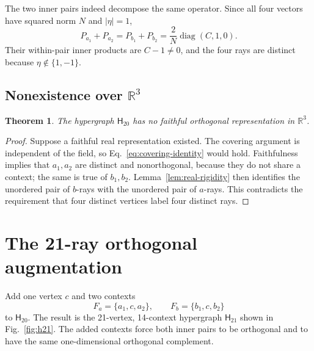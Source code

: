 \documentclass[twocolumn,aps,pra,floatfix,amsmath,amssymb,longbibliography]{revtex4-2}
\newtheorem{theorem}{Theorem}
\theoremstyle{definition}
\theoremstyle{remark}
\newcommand{\R}{\mathbb R}
\newcommand{\Htwenty}{\mathsf H_{20}}
\newcommand{\Htwentyone}{\mathsf H_{21}}
\begin{document}
The two inner pairs indeed decompose the same operator.  Since all four
vectors have squared norm $N$ and $|\eta|=1$,
\begin{equation}
 P_{a_1}+P_{a_2}=P_{b_1}+P_{b_2}
 =\frac{2}{N}\operatorname{diag}(C,1,0).
 \label{eq:complex-two-sum}
\end{equation}
Their within-pair inner products are $C-1\ne0$, and the four rays are
distinct because $\eta\notin\{1,-1\}$.

\subsection{Nonexistence over \texorpdfstring{$\R^3$}{R3}}

\begin{theorem}
\label{thm:h20-real}
The hypergraph $\Htwenty$ has no faithful orthogonal representation in
$\R^3$.
\end{theorem}

\begin{proof}
Suppose a faithful real representation existed.  The covering argument
is independent of the field, so Eq.~\eqref{eq:covering-identity} would
hold.  Faithfulness implies that $a_1,a_2$ are distinct and
nonorthogonal, because they do not share a context; the same is true of
$b_1,b_2$.  Lemma~\ref{lem:real-rigidity} then identifies the unordered
pair of $b$-rays with the unordered pair of $a$-rays.  This contradicts
the requirement that four distinct vertices label four distinct rays.
\end{proof}

\section{The 21-ray orthogonal augmentation}
\label{sec:h21}

Add one vertex $c$ and two contexts
\begin{equation}
 F_a=\{a_1,c,a_2\},\qquad F_b=\{b_1,c,b_2\}
 \label{eq:added-contexts}
\end{equation}
to $\Htwenty$.  The result is the 21-vertex, 14-context hypergraph
$\Htwentyone$ shown in Fig.~\ref{fig:h21}.  The added contexts force both
inner pairs to be orthogonal and to have the same one-dimensional
orthogonal complement.
\end{document}
